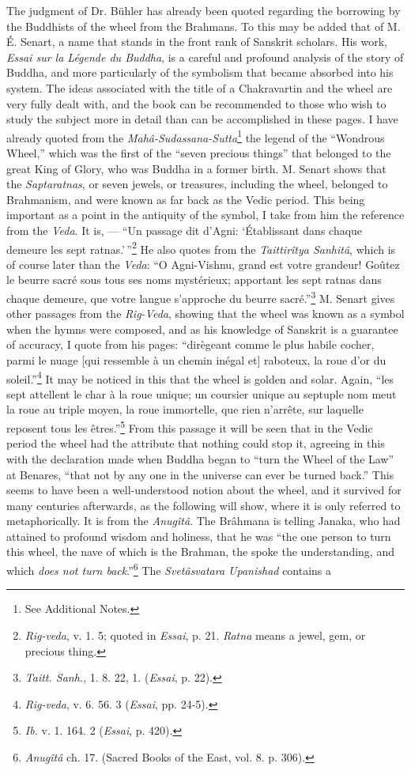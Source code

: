 \documentclass[a4paper, 11pt, oneside, polutonikogreek, english]{article}
\begin{document}
The judgment of Dr. Bühler has already been quoted regarding the borrowing by the Buddhists of the wheel from the Brahmans. To this may be added that of M. É. Senart, a name that stands in the front rank of Sanskrit scholars. His work, \emph{Essai sur la Légende du Buddha}, is a careful and profound analysis of the story of Buddha, and more particularly of the symbolism that became absorbed into his system. The ideas associated with the title of a Chakravartin and the wheel are very fully dealt with, and the book can be recommended to those who wish to study the subject more in detail than can be accomplished in these pages. I have already quoted from the \emph{Mahâ-Sudassana-Sutta}\footnote{See Additional Notes.} the legend of the ``Wondrous Wheel,'' which was the first of the ``seven precious things'' that belonged to the great King of Glory, who was Buddha in a former birth. M. Senart shows that the \emph{Saptaratnas}, or seven jewels, or treasures, including the wheel, belonged to Brahmanism, and were known as far back as the Vedic period. This being important as a point in the antiquity of the symbol, I take from him the reference from the \emph{Veda}. It is, --- ``Un passage dit d'Agni: `Établissant dans chaque demeure les sept ratnas.'\,''\footnote{\emph{Rig-veda}, v. 1. 5; quoted in \emph{Essai}, p. 21. \emph{Ratna} means a jewel, gem, or precious thing.} He also quotes from the \emph{Taittirîtya Sanhitâ}, which is of course later than the \emph{Veda}: ``O Agni-Vishnu, grand est votre grandeur! Goûtez le beurre sacré sous tous ses noms mystérieux; apportant les sept ratnas dans chaque demeure, que votre langue s'approche du beurre sacré.''\footnote{\emph{Taitt. Sanh.}, 1. 8. 22, 1. (\emph{Essai}, p. 22).} M. Senart gives other passages from the \emph{Rig-Veda}, showing that the wheel was known as a symbol when the hymns were composed, and as his knowledge of Sanskrit is a guarantee of accuracy, I quote from his pages: ``dirègeant comme le plus habile cocher, parmi le nuage [qui ressemble à un chemin inégal et] raboteux, la roue d'or du soleil.''\footnote{\emph{Rig-veda}, v. 6. 56. 3 (\emph{Essai}, pp. 24-5).} It may be noticed in this that the wheel is golden and solar. Again, ``les sept attellent le char à la roue unique; un coursier unique au septuple nom meut la roue au triple moyen, la roue immortelle, que rien n'arrête, sur laquelle reposent tous les êtres.''\footnote{\emph{Ib.} v. 1. 164. 2 (\emph{Essai}, p. 420).} From this passage it will be seen that in the Vedic period the wheel had the attribute that nothing could stop it, agreeing in this with the declaration made when Buddha began to ``turn the Wheel of the Law'' at Benares, ``that not by any one in the universe can ever be turned back.'' This seems to have been a well-understood notion about the wheel, and it survived for many centuries afterwards, as the following will show, where it is only referred to metaphorically. It is from the \emph{Anugîtâ}. The Brâhmana is telling Janaka, who had attained to profound wisdom and holiness, that he was ``the one person to turn this wheel, the nave of which is the Brahman, the spoke the understanding, and which \emph{does not turn back}.''\footnote{\emph{Anugîtâ} ch. 17. (Sacred Books of the East, vol. 8. p. 306).} The \emph{Svetâsvatara Upanishad} contains a 
\end{document}
